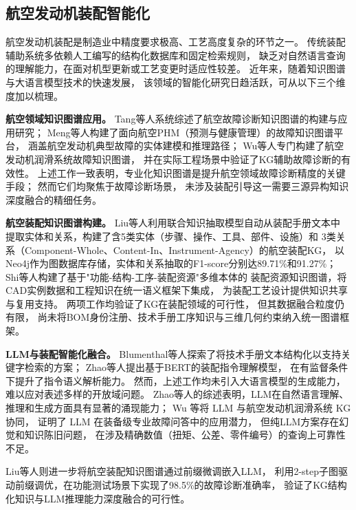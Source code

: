 \subsection{航空发动机装配智能化}
\label{sec:related-aero}

航空发动机装配是制造业中精度要求极高、工艺高度复杂的环节之一。
传统装配辅助系统多依赖人工编写的结构化数据库和固定检索规则，
缺乏对自然语言查询的理解能力，在面对机型更新或工艺变更时适应性较差。
近年来，随着知识图谱与大语言模型技术的快速发展，
该领域的智能化研究日趋活跃，可从以下三个维度加以梳理。

\textbf{航空领域知识图谱应用。}
Tang等人\cite{tang2023aircraft}系统综述了航空故障诊断知识图谱的构建与应用研究；
Meng等人\cite{meng2024aircraft}构建了面向航空PHM（预测与健康管理）的故障知识图谱平台，
涵盖航空发动机典型故障的实体建模和推理路径；
Wu等人\cite{wu2024engine}专门构建了航空发动机润滑系统故障知识图谱，
并在实际工程场景中验证了KG辅助故障诊断的有效性。
上述工作一致表明，专业化知识图谱是提升航空领域故障诊断精度的关键手段；
然而它们均聚焦于故障诊断场景，
未涉及装配引导这一需要三源异构知识深度融合的精细任务。

\textbf{航空装配知识图谱构建。}
Liu等人\cite{liu2023avkg}利用联合知识抽取模型自动从装配手册文本中
提取实体和关系，构建了含5类实体（步骤、操作、工具、部件、设施）和
3类关系（Component-Whole、Content-In、Instrument-Agency）的航空装配KG，
以Neo4j作为图数据库存储，实体和关系抽取的F1-score分别达89.71\%和91.27\%；
Shi等人\cite{shi2022arkg}构建了基于"功能-结构-工序-装配资源"多维本体的
装配资源知识图谱，将CAD实例数据和工程知识在统一语义框架下集成，
为装配工艺设计提供知识共享与复用支持。
两项工作均验证了KG在装配领域的可行性，
但其数据融合粒度仍有限，
尚未将BOM身份注册、技术手册工序知识与三维几何约束纳入统一图谱框架。

\textbf{LLM与装配智能化融合。}
Blumenthal等人\cite{blumenthal2020nlp}探索了将技术手册文本结构化以支持关键字检索的方案；
Zhao等人\cite{zhao2022assembly}提出基于BERT\cite{devlin2019bert}的装配指令理解模型，
在有监督条件下提升了指令语义解析能力。
然而，上述工作均未引入大语言模型的生成能力，难以应对表述多样的开放域问题。
Zhao等人\cite{zhao2023llmsurvey}的综述表明，LLM在自然语言理解、
推理和生成方面具有显著的涌现能力；
Wu 等\cite{wu2024engine}将 LLM 与航空发动机润滑系统 KG 协同，
证明了 LLM 在装备级专业故障问答中的应用潜力，
但纯LLM方案存在幻觉和知识陈旧问题，
在涉及精确数值（扭矩、公差、零件编号）的查询上可靠性不足\cite{fan2024ragsurvey}。

Liu等人\cite{liu2024jointkg}则进一步将航空装配知识图谱通过前缀微调嵌入LLM，
利用2-step子图驱动前缀调优，在功能测试场景下实现了98.5\%的故障诊断准确率，
验证了KG结构化知识与LLM推理能力深度融合的可行性。

